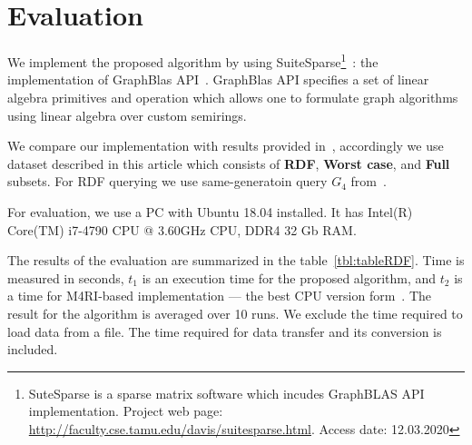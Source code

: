 \section{Evaluation}

We implement the proposed algorithm by using SuiteSparse\footnote{SuteSparse is a sparse matrix software which incudes GraphBLAS API implementation. Project web page: \url{http://faculty.cse.tamu.edu/davis/suitesparse.html}. Access date: 12.03.2020}~\cite{Davis2018Algorithm9S}: the implementation of GraphBlas API~\cite{7761646}. GraphBlas API specifies a set of linear algebra primitives and operation which allows one to formulate graph algorithms using linear algebra over custom semirings. 

We compare our implementation with results provided in~\cite{10.1145/3327964.3328503}, accordingly we use dataset described in this article which consists of \textbf{RDF}, \textbf{Worst case}, and \textbf{Full} subsets. For RDF querying we use same-generatoin query $G_4$ from~\cite{10.1145/3327964.3328503}.

For evaluation, we use a PC with Ubuntu 18.04 installed. It has Intel(R) Core(TM) i7-4790 CPU @ 3.60GHz CPU, DDR4 32 Gb RAM.

The results of the evaluation are summarized in the table~\ref{tbl:tableRDF}.
Time is measured in seconds, $t_1$ is an execution time for the proposed algorithm, and $t_2$ is a time for M4RI-based implementation --- the best CPU version form~\cite{10.1145/3327964.3328503}. The result for the algorithm is averaged over 10 runs. We exclude the time required to load data from a file. The time required for data transfer and its conversion is included.


